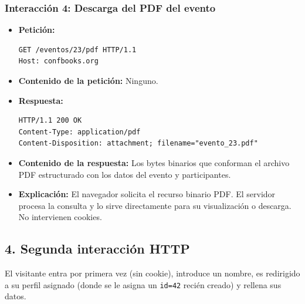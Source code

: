 \subsubsection*{Interacción 4: Descarga del PDF del evento}
\begin{itemize}
    \item \textbf{Petición:}
    \begin{verbatim}
GET /eventos/23/pdf HTTP/1.1
Host: confbooks.org
    \end{verbatim}
    \item \textbf{Contenido de la petición:} Ninguno.
    \item \textbf{Respuesta:}
    \begin{verbatim}
HTTP/1.1 200 OK
Content-Type: application/pdf
Content-Disposition: attachment; filename="evento_23.pdf"
    \end{verbatim}
    \item \textbf{Contenido de la respuesta:} Los bytes binarios que conforman el archivo PDF estructurado con los datos del evento y participantes.
    \item \textbf{Explicación:} El navegador solicita el recurso binario PDF. El servidor procesa la consulta y lo sirve directamente para su visualización o descarga. No intervienen cookies.
\end{itemize}

\subsection*{4. Segunda interacción HTTP}

El visitante entra por primera vez (sin cookie), introduce un nombre, es redirigido a su perfil asignado (donde se le asigna un \texttt{id=42} recién creado) y rellena sus datos.

